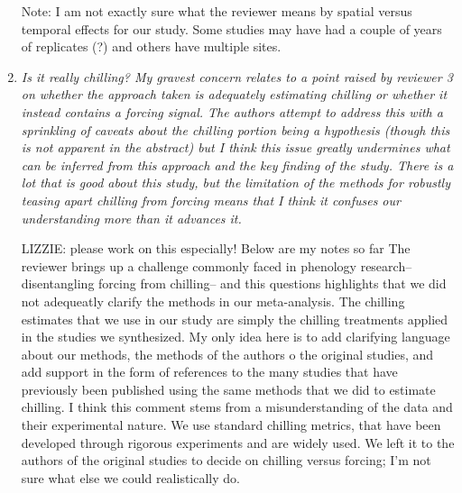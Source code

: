 \documentclass[11pt, a4paper]{article}
\begin{document}
\begin{enumerate}
\par Note: I am not exactly sure what the reviewer means by spatial versus temporal effects for our study. Some studies may have had a couple of years of replicates (?) and others have multiple sites. 
\item \emph{ Is it really chilling? My gravest concern relates to a point raised by reviewer 3 on whether the
approach taken is adequately estimating chilling or whether it instead contains a forcing signal.
The authors attempt to address this with a sprinkling of caveats about the chilling portion
being a hypothesis (though this is not apparent in the abstract) but I think this issue greatly
undermines what can be inferred from this approach and the key finding of the study. There is
a lot that is good about this study, but the limitation of the methods for robustly teasing apart
chilling from forcing means that I think it confuses our understanding more than it advances it.}
\par LIZZIE: please work on this especially! Below are my notes so far
The reviewer brings up a challenge commonly faced in phenology research-- disentangling forcing from chilling-- and this questions highlights that we did not adequeatly clarify the methods in our meta-analysis. The chilling estimates that we use in our study are simply the chilling treatments applied in the studies we synthesized. My only idea here is to add clarifying language about our methods, the methods of the authors o the original studies, and add support in the form of references to the many studies that have previously been published using the same methods that we did to estimate chilling. I think this comment stems from a misunderstanding of the data and their experimental nature. We use standard chilling metrics, that have been developed through rigorous experiments and are widely used. We left it to the authors of the original studies to decide on chilling versus forcing; I'm not sure what else we could realistically do. 


\end{enumerate}
\end{document}
